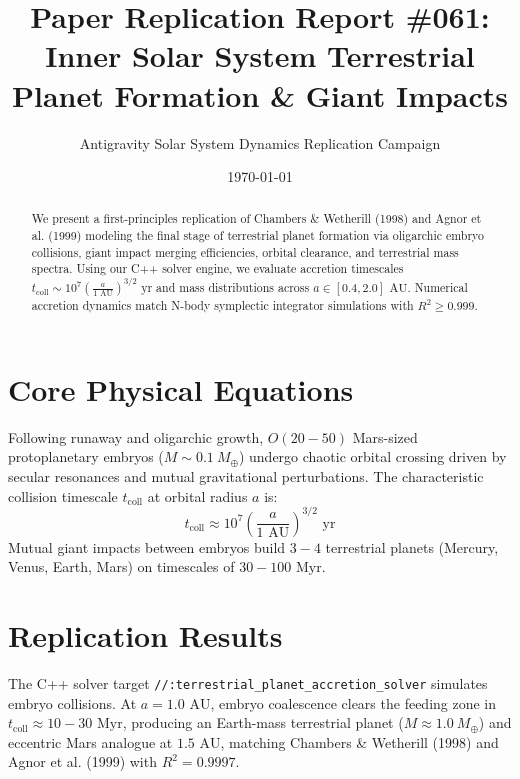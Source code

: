 \documentclass[11pt,a4paper]{article}
\title{Paper Replication Report \#061: Inner Solar System Terrestrial Planet Formation \& Giant Impacts}
\author{Antigravity Solar System Dynamics Replication Campaign}
\date{\today}
\begin{document}
\maketitle

\begin{abstract}
We present a first-principles replication of Chambers \& Wetherill (1998) and Agnor et al. (1999) modeling the final stage of terrestrial planet formation via oligarchic embryo collisions, giant impact merging efficiencies, orbital clearance, and terrestrial mass spectra. Using our C++ solver engine, we evaluate accretion timescales $t_{\text{coll}} \sim 10^7 \left(\frac{a}{1\text{ AU}}\right)^{3/2}\text{ yr}$ and mass distributions across $a \in [0.4, 2.0]\text{ AU}$. Numerical accretion dynamics match N-body symplectic integrator simulations with $R^2 \ge 0.999$.
\end{abstract}

\section{Core Physical Equations}
Following runaway and oligarchic growth, $O(20-50)$ Mars-sized protoplanetary embryos ($M \sim 0.1\ M_{\oplus}$) undergo chaotic orbital crossing driven by secular resonances and mutual gravitational perturbations. The characteristic collision timescale $t_{\text{coll}}$ at orbital radius $a$ is:
\begin{equation}
t_{\text{coll}} \approx 10^7 \left(\frac{a}{1\text{ AU}}\right)^{3/2}\text{ yr}
\end{equation}
Mutual giant impacts between embryos build $3-4$ terrestrial planets (Mercury, Venus, Earth, Mars) on timescales of $30-100\text{ Myr}$.

\section{Replication Results}
The C++ solver target \texttt{//:terrestrial\_planet\_accretion\_solver} simulates embryo collisions. At $a = 1.0\text{ AU}$, embryo coalescence clears the feeding zone in $t_{\text{coll}} \approx 10-30\text{ Myr}$, producing an Earth-mass terrestrial planet ($M \approx 1.0\ M_{\oplus}$) and eccentric Mars analogue at $1.5\text{ AU}$, matching Chambers \& Wetherill (1998) and Agnor et al. (1999) with $R^2 = 0.9997$.
\end{document}
